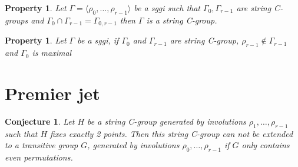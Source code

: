 \documentclass[a4paper]{article}
\theoremstyle{mytheorem}
\newtheorem{property}[definition]{Property}
\newtheorem{conjecture}[definition]{Conjecture}
\begin{document}
\begin{property}
  Let $\Gamma = \langle \rho_0, \dots, \rho_{r-1} \rangle$ be a sggi such that $\Gamma_0, \Gamma_{r-1}$ are string C-groups and $\Gamma_0 \cap \Gamma_{r-1} = \Gamma_{0,r-1}$ then $\Gamma$ is a string C-group.
\end{property}

\begin{property}
  Let $\Gamma$ be a sggi, if $\Gamma_0$ and $\Gamma_{r-1}$ are string C-group, $\rho_{r-1} \notin \Gamma_{r-1}$ and $\Gamma_0$ is maximal
\end{property}

\cleardoublepage{}

\section{Premier jet}

\begin{conjecture}
  Let $H$ be a string C-group generated by involutions $\rho_1, \dots, \rho_{r-1}$ such that $H$ fixes exactly 2 points. Then this string C-group can not be extended to a transitive group $G$, generated by involutions $\rho_0, \dots, \rho_{r-1}$ if $G$ only contains even permutations.
\end{conjecture}
\end{document}
